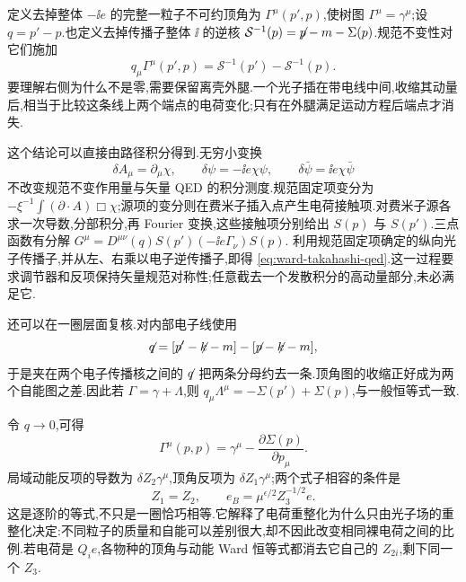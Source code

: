 
定义去掉整体 $-\ii e$ 的完整一粒子不可约顶角为 $\Gamma^\mu(p',p)$,使树图 $\Gamma^\mu=\gamma^\mu$;设 $q=p'-p$.也定义去掉传播子整体 $\ii$ 的逆核 $\mathcal S^{-1}(p)=\slashed p-m-\Sigma(p)$.规范不变性对它们施加
\begin{equation}
 q_\mu\Gamma^\mu(p',p)=\mathcal S^{-1}(p')-\mathcal S^{-1}(p).
 \label{eq:ward-takahashi-qed}
\end{equation}
要理解右侧为什么不是零,需要保留离壳外腿.一个光子插在带电线中间,收缩其动量后,相当于比较这条线上两个端点的电荷变化;只有在外腿满足运动方程后端点才消失.

这个结论可以直接由路径积分得到.无穷小变换
\begin{equation}
 \delta A_\mu=\partial_\mu\chi,\qquad
 \delta\psi=-\ii e\chi\psi,\qquad
 \delta\bar\psi=\ii e\chi\bar\psi
\end{equation}
不改变规范不变作用量与矢量 QED 的积分测度.规范固定项变分为
$-\xi^{-1}\int(\partial\cdot A)\Box\chi$;源项的变分则在费米子插入点产生电荷接触项.对费米子源各求一次导数,分部积分,再 Fourier 变换,这些接触项分别给出 $S(p)$ 与 $S(p')$.三点函数有分解
$G^\mu=D^{\mu\nu}(q)S(p')(-\ii e\Gamma_\nu)S(p)$.
利用规范固定项确定的纵向光子传播子,并从左、右乘以电子逆传播子,即得 \eqref{eq:ward-takahashi-qed}.这一过程要求调节器和反项保持矢量规范对称性;任意截去一个发散积分的高动量部分,未必满足它.

还可以在一圈层面复核.对内部电子线使用
\begin{equation}
 \slashed q=[\slashed p'-\slashed k-m]-[\slashed p-\slashed k-m],
\end{equation}
于是夹在两个电子传播核之间的 $\slashed q$ 把两条分母约去一条.顶角图的收缩正好成为两个自能图之差.因此若 $\Gamma=\gamma+\Lambda$,则
$q_\mu\Lambda^\mu=-\Sigma(p')+\Sigma(p)$,与一般恒等式一致.

令 $q\to0$,可得
\begin{equation}
 \Gamma^\mu(p,p)=\gamma^\mu-\frac{\partial\Sigma(p)}{\partial p_\mu}.
 \label{eq:ward-zero-transfer}
\end{equation}
局域动能反项的导数为 $\delta Z_2\gamma^\mu$,顶角反项为 $\delta Z_1\gamma^\mu$;两个式子相容的条件是
\begin{equation}
 Z_1=Z_2,\qquad e_B=\mu^{\epsilon/2}Z_3^{-1/2}e.
 \label{eq:qed-z1-z2}
\end{equation}
这是逐阶的等式,不只是一圈恰巧相等.它解释了电荷重整化为什么只由光子场的重整化决定:不同粒子的质量和自能可以差别很大,却不因此改变相同裸电荷之间的比例.若电荷是 $Q_ie$,各物种的顶角与动能 Ward 恒等式都消去它自己的 $Z_{2i}$,剩下同一个 $Z_3$.

